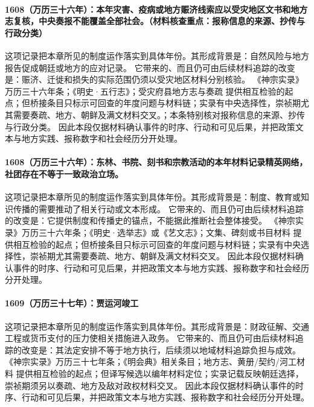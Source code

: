 \paragraph{1608（万历三十六年）：本年灾害、疫病或地方赈济线索应以受灾地区文书和地方志复核，中央奏报不能覆盖全部社会。（材料核查重点：报称信息的来源、抄传与行政分类）} 这项记录把本章所见的制度运作落实到具体年份。其形成背景是：自然风险与地方报告促成朝廷或地方的应对记录。 它带来的、而且仍可由后续材料追踪的改变是：赈济、迁徙和损失的实际范围仍须以受灾地区材料分别核验。 《神宗实录》万历三十六年条；《明史·五行志》；受灾府县地方志与奏疏 提供相互检验的起点；但桥接条目只标示可回查的年度问题与材料链；实录有中央选择性，崇祯期尤其需要奏疏、地方、朝鲜及满文材料交叉。；本条特别核对报称信息的来源、抄传与行政分类。 因此本段仅据材料确认事件的时序、行动和可见后果，并把政策文本与地方实践、报称数字和社会经历分开处理。

\paragraph{1608（万历三十六年）：东林、书院、刻书和宗教活动的本年材料记录精英网络，社团存在不等于一致政治立场。} 这项记录把本章所见的制度运作落实到具体年份。其形成背景是：制度、教育或知识传播的需要推动了相关行动或文本形成。 它带来的、而且仍可由后续材料追踪的改变是：它提供制度和传播史的锚点，不能据此推断社会整体接受。 《神宗实录》万历三十六年条；《明史·选举志》或《艺文志》；文集、碑刻或书目材料 提供相互检验的起点；但桥接条目只标示可回查的年度问题与材料链；实录有中央选择性，崇祯期尤其需要奏疏、地方、朝鲜及满文材料交叉。 因此本段仅据材料确认事件的时序、行动和可见后果，并把政策文本与地方实践、报称数字和社会经历分开处理。

\paragraph{1609（万历三十七年）：贾运河竣工} 这项记录把本章所见的制度运作落实到具体年份。其形成背景是：财政征解、交通工程或货币支付的压力使相关措施进入政务。 它带来的、而且仍可由后续材料追踪的改变是：其法定安排不等于地方执行，后续须以地域材料追踪负担与成效。 《神宗实录》万历三十七年条；《明会典》相关条目；地方志、黄册/契约/河工材料 提供相互检验的起点；但译写候选以编年材料定位；实录记载反映朝廷选择，崇祯期须另以奏疏、地方及敌对政权材料交叉。 因此本段仅据材料确认事件的时序、行动和可见后果，并把政策文本与地方实践、报称数字和社会经历分开处理。

